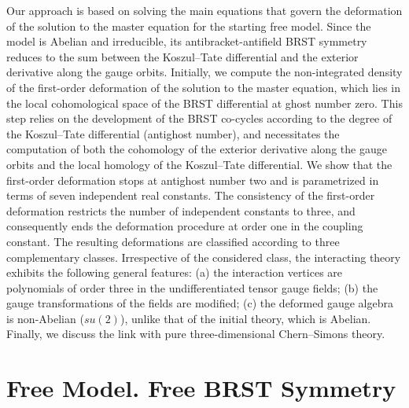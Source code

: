\documentclass[a4paper,11pt]{article}
\begin{document}
Our approach is based on solving the main equations that govern the
deformation of the solution to the master equation for the starting free
model. Since the model is Abelian and irreducible, its antibracket-antifield
BRST symmetry reduces to the sum between the Koszul--Tate differential and
the exterior derivative along the gauge orbits. Initially, we compute the
non-integrated density of the first-order deformation of the solution to the
master equation, which lies in the local cohomological space of the BRST
differential at ghost number zero. This step relies on the development of
the BRST co-cycles according to the degree of the Koszul--Tate differential
(antighost number), and necessitates the computation of both the cohomology
of the exterior derivative along the gauge orbits and the local homology of
the Koszul--Tate differential. We show that the first-order deformation
stops at antighost number two and is parametrized in terms of seven
independent real constants. The consistency of the first-order deformation
restricts the number of independent constants to three, and consequently
ends the deformation procedure at order one in the coupling constant. The
resulting deformations are classified according to three complementary
classes. Irrespective of the considered class, the interacting theory
exhibits the following general features: (a) the interaction vertices are
polynomials of order three in the undifferentiated tensor gauge fields; (b)
the gauge transformations of the fields are modified; (c) the deformed gauge
algebra is non-Abelian ($su(2)$), unlike that of the initial theory, which
is Abelian. Finally, we discuss the link with pure three-dimensional
Chern--Simons theory.

\section{Free Model. Free BRST Symmetry}
\end{document}
